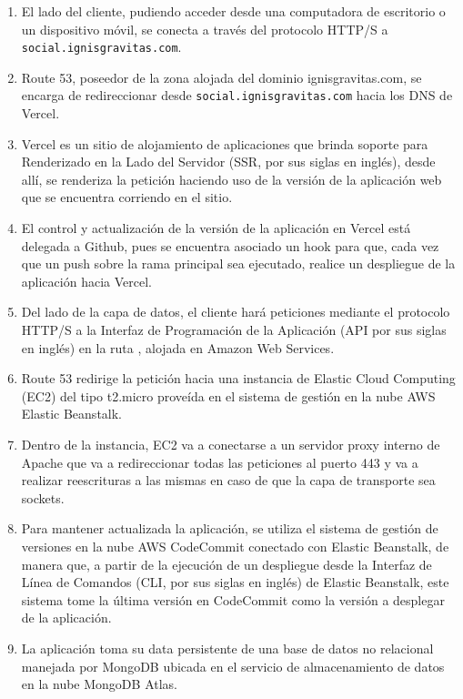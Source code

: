     \begin{enumerate}
        \item El lado del cliente, pudiendo acceder desde una computadora de escritorio o un dispositivo móvil, se conecta a través del protocolo HTTP/S a \texttt{social.ignisgravitas.com}.
        \item Route 53, poseedor de la zona alojada del dominio ignisgravitas.com, se encarga de redireccionar desde \texttt{social.ignisgravitas.com} hacia los DNS de Vercel.
        \item Vercel es un sitio de alojamiento de aplicaciones que brinda soporte para Renderizado en la Lado del Servidor (SSR, por sus siglas en inglés), desde allí, se renderiza la petición haciendo uso de la versión de la aplicación web que se encuentra corriendo en el sitio.
        \item El control y actualización de la versión de la aplicación en Vercel está delegada a Github, pues se encuentra asociado un hook para que, cada vez que un push sobre la rama principal sea ejecutado, realice un despliegue de la aplicación hacia Vercel.
        \item Del lado de la capa de datos, el cliente hará peticiones mediante el protocolo HTTP/S a la Interfaz de Programación de la Aplicación (API por sus siglas en inglés) en la ruta , alojada en Amazon Web Services.
        \item Route 53 redirige la petición hacia una instancia de Elastic Cloud Computing (EC2) del tipo t2.micro proveída en el sistema de gestión en la nube AWS Elastic Beanstalk.
        \item Dentro de la instancia, EC2 va a conectarse a un servidor proxy interno de Apache que va a redireccionar todas las peticiones al puerto 443 y va a realizar reescrituras a las mismas en caso de que la capa de transporte sea sockets.
        \item Para mantener actualizada la aplicación, se utiliza el sistema de gestión de versiones en la nube AWS CodeCommit conectado con Elastic Beanstalk, de manera que, a partir de la ejecución de un despliegue desde la Interfaz de Línea de Comandos (CLI, por sus siglas en inglés) de Elastic Beanstalk, este sistema tome la última versión en CodeCommit como la versión a desplegar de la aplicación.
        \item La aplicación toma su data persistente de una base de datos no relacional manejada por MongoDB ubicada en el servicio de almacenamiento de datos en la nube MongoDB Atlas.
    \end{enumerate}
